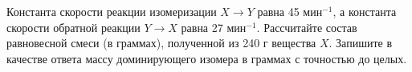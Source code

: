 
Константа скорости реакции изомеризации $X \rightarrow Y$ равна 45 мин$^{-1}$, а константа скорости обратной 
реакции $Y \rightarrow X$ равна 27 мин$^{-1}$. Рассчитайте состав равновесной смеси (в граммах), полученной из 
240 г вещества $X$. Запишите в качестве ответа массу доминирующего изомера в граммах с точностью до целых.

